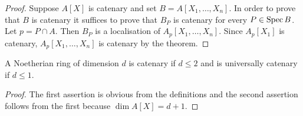 \begin{proof}
Suppose $A[X]$ is catenary and set $B = A[X_1, \ldots, X_n]$. In order to prove that
$B$ is catenary it suffices to prove that $B_P$ is catenary for every $P \in \operatorname{Spec} B$.
Let $p = P \cap A$. Then $B_P$ is a localisation of $A_p[X_1, \ldots, X_n]$. Since
$A_p[X_1]$ is catenary, $A_p[X_1, \ldots, X_n]$ is catenary by the theorem.
\end{proof}

\begin{corollary*}
A Noetherian ring of dimension $d$ is catenary if $d \le 2$ and is universally
catenary if $d \le 1$.
\end{corollary*}

\begin{proof}
The first assertion is obvious from the definitions and the second assertion
follows from the first because $\dim A[X] = d + 1$.
\end{proof}
